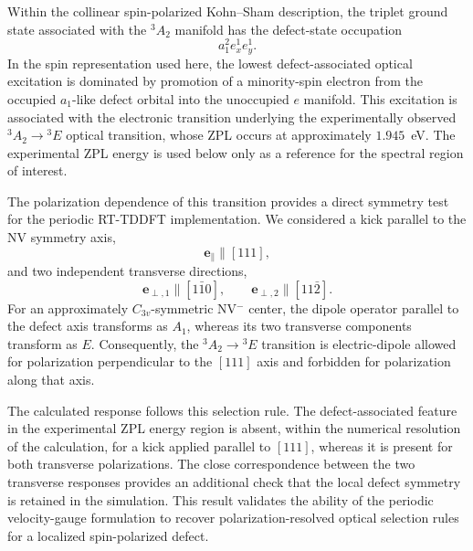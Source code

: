 Within the collinear spin-polarized Kohn--Sham description, the
triplet ground state associated with the ${}^3A_2$ manifold has the
defect-state occupation
%
\begin{equation}
a_1^2 e_x^1 e_y^1.
\label{eq:nv-triplet-occupation}
\end{equation}
%
In the spin representation used here, the lowest defect-associated
optical excitation is dominated by promotion of a minority-spin
electron from the occupied $a_1$-like defect orbital into the
unoccupied $e$ manifold.  This excitation is associated with the
electronic transition underlying the experimentally observed
${}^3A_2 \rightarrow {}^3E$ optical transition, whose ZPL occurs at
approximately $1.945$~eV.\cite{NV-Doherty-2013}
The experimental ZPL energy is used below only as a reference for the
spectral region of interest.

The polarization dependence of this transition provides a direct
symmetry test for the periodic RT-TDDFT implementation.  We considered
a kick parallel to the NV symmetry axis,
%
\begin{equation}
\mathbf{e}_{\parallel} \parallel [111],
\label{eq:nv-parallel-polarization}
\end{equation}
%
and two independent transverse directions,
%
\begin{equation}
\mathbf{e}_{\perp,1} \parallel [1\bar{1}0],
\qquad
\mathbf{e}_{\perp,2} \parallel [11\bar{2}].
\label{eq:nv-transverse-polarizations}
\end{equation}
%
For an approximately $C_{3v}$-symmetric NV$^-$ center, the dipole
operator parallel to the defect axis transforms as $A_1$, whereas its
two transverse components transform as $E$.  Consequently, the
${}^3A_2 \rightarrow {}^3E$ transition is electric-dipole allowed for
polarization perpendicular to the $[111]$ axis and forbidden for
polarization along that axis.

The calculated response follows this selection rule.  The
defect-associated feature in the experimental ZPL energy region is
absent, within the numerical resolution of the calculation, for a
kick applied parallel to $[111]$, whereas it is present for both
transverse polarizations.  The close correspondence between the two
transverse responses provides an additional check that the local
defect symmetry is retained in the simulation.  This result validates
the ability of the periodic velocity-gauge formulation to recover
polarization-resolved optical selection rules for a localized
spin-polarized defect.

